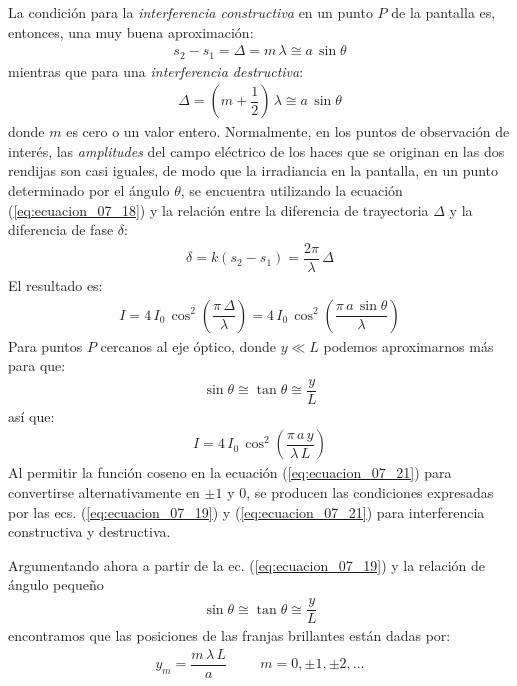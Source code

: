 \documentclass[14pt]{extarticle}
\begin{document}
\par
La condición para la \textit{interferencia constructiva} en un punto $P$ de la pantalla es, entonces, una muy buena aproximación:
\begin{align}
s_{2} - s_{1} = \Delta = m \, \lambda \cong a \, \sin \theta
\label{eq:ecuacion_07_19}
\end{align}
mientras que para una \textit{interferencia destructiva}:
\begin{align}
\Delta = \left( m + \dfrac{1}{2} \right) \, \lambda \cong a \, \sin \theta
\label{eq:ecuacion_07_20}
\end{align}
donde $m$ es cero o un valor entero. Normalmente, en los puntos de observación de interés, las \textit{amplitudes} del campo eléctrico de los haces que se originan en las dos rendijas son casi iguales, de modo que la irradiancia en la pantalla, en un punto determinado por el ángulo $\theta$, se encuentra utilizando la ecuación (\ref{eq:ecuacion_07_18}) y la relación entre la diferencia de trayectoria $\Delta$ y la diferencia de fase $\delta$:
\begin{align*}
\delta = k \left( s_{2} - s_{1} \right) = \dfrac{2 \pi}{\lambda} \, \Delta
\end{align*}
El resultado es:
\begin{align*}
I = 4 \, I_{0} \, \cos^{2} \left( \dfrac{\pi \, \Delta}{\lambda} \right) = 4 \, I_{0} \, \cos^{2} \left( \dfrac{\pi \, a \, \sin \theta}{\lambda} \right)
\end{align*}
Para puntos $P$ cercanos al eje óptico, donde $y \ll L$ podemos aproximarnos más para que:
\begin{align*}
\sin \theta \cong \tan \theta \cong \dfrac{y}{L}
\end{align*}
así que:
\begin{align*}
I = 4 \, I_{0} \, \cos^{2} \left( \dfrac{\pi \, a \, y}{\lambda \, L} \right)
\label{eq:ecuacion_07_21}
\end{align*}
Al permitir la función coseno en la ecuación (\ref{eq:ecuacion_07_21}) para convertirse alternativamente en  $\pm 1$ y $0$, se producen las condiciones expresadas por las ecs.  (\ref{eq:ecuacion_07_19}) y (\ref{eq:ecuacion_07_21}) para interferencia constructiva y destructiva.
\par
Argumentando ahora a partir de la ec. (\ref{eq:ecuacion_07_19}) y la relación de ángulo pequeño
\begin{align*}
\sin \theta \cong \tan \theta \cong \dfrac{y}{L}
\end{align*}
encontramos que las posiciones de las franjas brillantes están dadas por:
\begin{align}
y_{m} = \dfrac{m \, \lambda \, L}{a} \hspace{1cm} m = 0, \pm 1, \pm 2, \ldots
\end{align}
\end{document}
